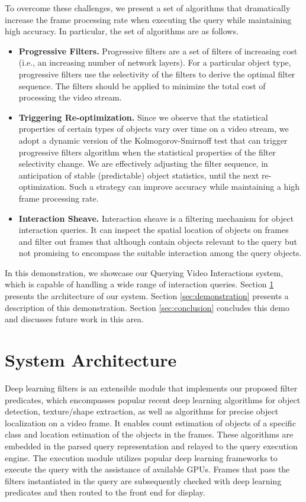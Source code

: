\documentclass[sigconf]{acmart}
\begin{document}
To overcome these challenges, we present a set of algorithms that dramatically increase the frame processing rate when executing the query while maintaining high accuracy. In particular, the set of algorithms are as follows. 
\begin{itemize}[itemsep=0pt, topsep=0pt, leftmargin=0pt, itemindent=20pt]
\item \textbf{Progressive Filters.} 
Progressive filters are a set of filters of increasing cost (i.e., an increasing number of network layers). For a particular object type, progressive filters use the selectivity of the filters to derive the optimal filter sequence. The filters should be applied to minimize the total cost of processing the video stream. 
\item \textbf{Triggering Re-optimization.} 
Since we observe that the statistical properties of certain types of objects vary over time on a video stream, we adopt a dynamic version of the Kolmogorov-Smirnoff test \cite{massey1951kolmogorov} that can trigger progressive filters algorithm when the statistical properties of the filter selectivity change. We are effectively adjusting the filter sequence, in anticipation of stable (predictable) object statistics, until the next re-optimization. Such a strategy can improve accuracy while maintaining a high frame processing rate. 
\item \textbf{Interaction Sheave.} 
Interaction sheave is a filtering mechanism for object interaction queries. It can inspect the spatial location of objects on frames and filter out frames that although contain objects relevant to the query but not promising to encompass the suitable interaction among the query objects.
\end{itemize}

In this demonstration, we showcase our Querying Video Interactions system, which is capable of handling a wide range of interaction queries. Section \ref{sec:architecture} presents the architecture of our system. Section \ref{sec:demonstration} presents a description of this demonstration. Section \ref{sec:conclusion} concludes this demo and discusses future work in this area. 


\section{System Architecture}
\label{sec:architecture}

Deep learning filters is an extensible module that implements our proposed filter predicates, which encompasses popular recent deep learning algorithms for object detection, texture/shape extraction, as well as algorithms for precise object localization on a video frame. It enables count estimation of objects of a specific class and location estimation of the objects in the frames. 
These algorithms are embedded in the parsed query representation and relayed to the query execution engine. The execution module utilizes popular deep learning frameworks to execute the query with the assistance of available GPUs. Frames that pass the filters instantiated in the query are subsequently checked with deep learning predicates and then routed to the front end for display.
\end{document}
